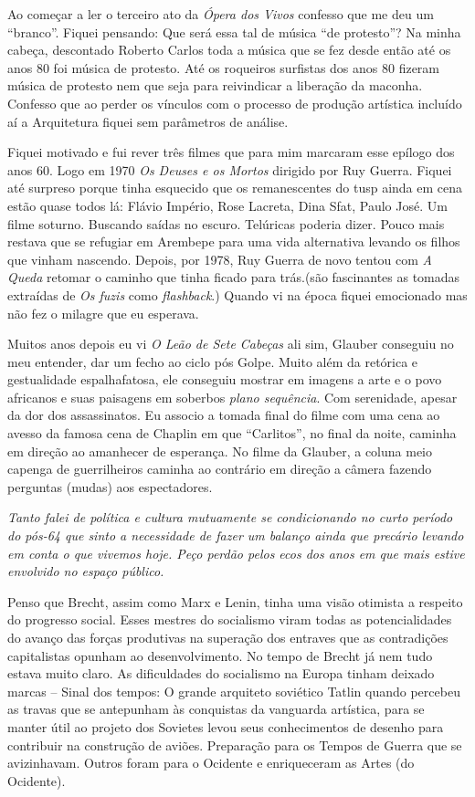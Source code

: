 Ao começar a ler o terceiro ato da {\it Ópera dos Vivos} confesso que me
deu um “branco”. Fiquei pensando: Que será essa tal de música “de
protesto”? Na minha cabeça, descontado Roberto Carlos toda a música que
se fez desde então até os anos 80 foi música de protesto. Até os
roqueiros surfistas dos anos 80 fizeram música de protesto nem que seja
para reivindicar a liberação da maconha. Confesso que ao perder os
vínculos com o processo de produção artística incluído aí a Arquitetura
fiquei sem parâmetros de análise.

Fiquei motivado e fui rever três filmes que para mim marcaram esse
epílogo dos anos 60. Logo em 1970 {\it Os Deuses e os Mortos} dirigido
por Ruy Guerra. Fiquei até surpreso porque tinha esquecido que os
remanescentes do {\sc tusp} ainda em cena estão quase todos lá: Flávio
Império, Rose Lacreta, Dina Sfat, Paulo José. Um filme soturno. Buscando
saídas no escuro. Telúricas poderia dizer. Pouco mais restava que se
refugiar em Arembepe para uma vida alternativa levando os filhos que
vinham nascendo. Depois, por 1978, Ruy Guerra de novo tentou com {\it A
Queda} retomar o caminho que tinha ficado para trás.(são fascinantes as
tomadas extraídas de {\it Os fuzis} como {\it flashback}.) Quando vi na
época fiquei emocionado mas não fez o milagre que eu esperava.

Muitos anos depois eu vi {\it O Leão de Sete Cabeças} ali sim, Glauber
conseguiu no meu entender, dar um fecho ao ciclo pós Golpe. Muito além
da retórica e gestualidade espalhafatosa, ele conseguiu mostrar em
imagens a arte e o povo africanos e suas paisagens em soberbos
{\it plano sequência}. Com serenidade, apesar da dor dos assassinatos.
Eu associo a tomada final do filme com uma cena ao avesso da famosa cena
de Chaplin em que “Carlitos”, no final da noite, caminha em direção ao
amanhecer de esperança. No filme da Glauber, a coluna meio capenga de
guerrilheiros caminha ao contrário em direção a câmera fazendo perguntas
(mudas) aos espectadores.

{\it Tanto falei de política e cultura mutuamente se condicionando no
curto período do pós-64 que sinto a necessidade de fazer um balanço
ainda que precário levando em conta o que vivemos hoje. Peço perdão
pelos ecos dos anos em que mais estive envolvido no espaço público.}

Penso que Brecht, assim como Marx e Lenin, tinha uma visão otimista a
respeito do progresso social. Esses mestres do socialismo viram todas as
potencialidades do avanço das forças produtivas na superação dos
entraves que as contradições capitalistas opunham ao desenvolvimento. No
tempo de Brecht já nem tudo estava muito claro. As dificuldades do
socialismo na Europa tinham deixado marcas -- Sinal dos tempos: O grande
arquiteto soviético Tatlin quando percebeu as travas que se antepunham
às conquistas da vanguarda artística, para se manter útil ao projeto dos
Sovietes levou seus conhecimentos de desenho para contribuir na
construção de aviões. Preparação para os Tempos de Guerra que se
avizinhavam. Outros foram para o Ocidente e enriqueceram as Artes (do
Ocidente).

